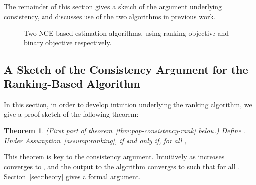 \documentclass[11pt,a4paper]{article}
\newtheorem{theorem}{Theorem}[section]
\begin{document}
The remainder of this section gives a sketch of the argument
underlying consistency, and discusses use of the two
algorithms in previous work.


\begin{figure}[t!]
\caption{Two NCE-based estimation algorithms, using ranking objective and binary objective respectively.}
\label{estimation1}
\end{figure}




\subsection{A Sketch of the Consistency Argument for the Ranking-Based Algorithm}
\label{sec:overview}

\newcommand{\ce}{\hbox{C}}

\newcommand{\bary}{\bar{y}}

In this section, in order to develop intuition underlying the ranking
algorithm, we give a proof sketch of the following theorem:
\begin{theorem} (First part of theorem~\ref{thm:pop-consistency-rank} below.)
Define .
Under Assumption~\ref{assump:ranking},  if and only if, for all ,

\label{th:fp}
\end{theorem}
\vspace{-0.5cm}
This theorem is key to the consistency argument.
Intuitively as  increases  converges to
, and the output to the algorithm converges to
 such that  for all . Section~\ref{sec:theory} gives a formal argument.
\end{document}
